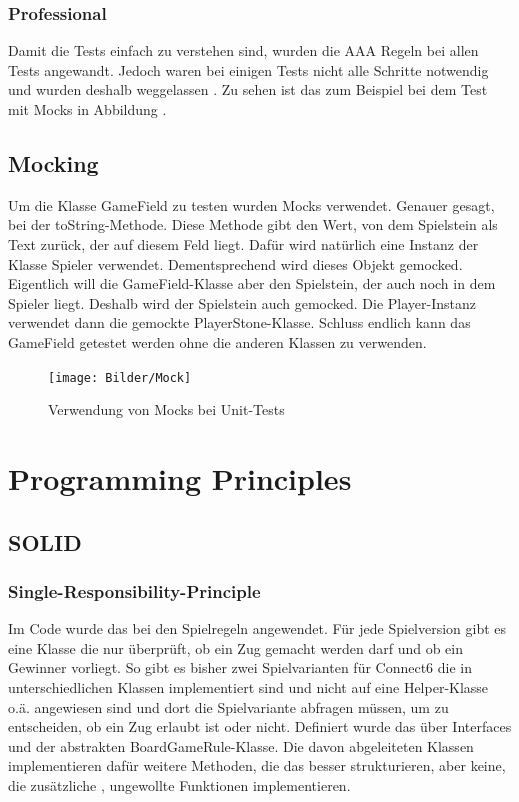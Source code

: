 \documentclass[12pt]{article}
\begin{document}
\subsubsection{Professional}
Damit die Tests einfach zu verstehen sind, wurden die AAA Regeln bei allen Tests angewandt. Jedoch waren bei einigen Tests nicht alle Schritte notwendig und wurden deshalb weggelassen . Zu sehen ist das zum Beispiel bei dem Test mit Mocks in Abbildung \pageref{fig:Mock}.

\newpage

\subsection{Mocking}
Um die Klasse GameField zu testen wurden Mocks verwendet. Genauer gesagt, bei der toString-Methode. Diese Methode gibt den Wert, von dem Spielstein als Text zurück, der auf diesem Feld liegt. Dafür wird natürlich eine Instanz der Klasse Spieler verwendet. Dementsprechend wird dieses Objekt gemocked. Eigentlich will die GameField-Klasse aber den Spielstein, der auch noch in dem Spieler liegt. Deshalb wird der Spielstein auch gemocked. Die Player-Instanz verwendet dann die gemockte PlayerStone-Klasse. Schluss endlich kann das GameField getestet werden ohne die anderen Klassen zu verwenden.


\begin{figure}[H]
\centering
{\texttt{[image: Bilder/Mock]}}
\caption{Verwendung von Mocks bei Unit-Tests}
\label{fig:Mock}
\end{figure}




\newpage
\section{Programming Principles}



\subsection{SOLID}


\subsubsection{Single-Responsibility-Principle}
Im Code wurde das bei den Spielregeln angewendet. Für jede Spielversion gibt es eine Klasse die nur überprüft, ob ein Zug gemacht werden darf und ob ein Gewinner vorliegt. So gibt es bisher zwei Spielvarianten für Connect6 die in unterschiedlichen Klassen implementiert sind und nicht auf eine Helper-Klasse o.ä. angewiesen sind und dort die Spielvariante abfragen müssen, um zu entscheiden, ob ein Zug erlaubt ist oder nicht. Definiert wurde das über Interfaces und der abstrakten BoardGameRule-Klasse. Die davon abgeleiteten Klassen implementieren dafür weitere Methoden, die das besser strukturieren, aber keine, die zusätzliche , ungewollte Funktionen implementieren.
\end{document}
